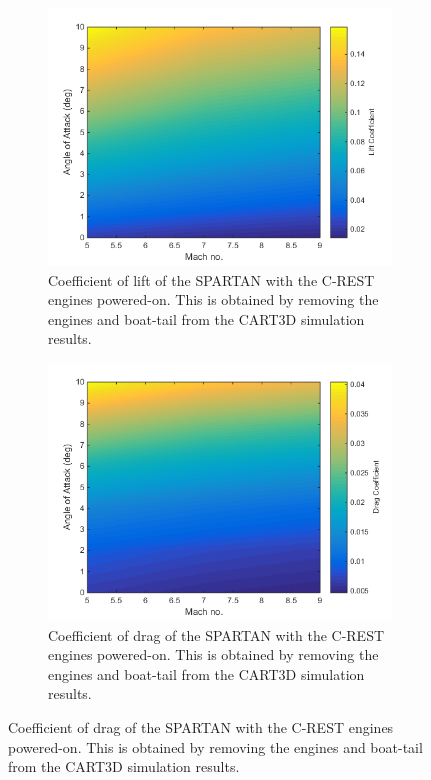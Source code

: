 \begin{figure}
	\begin{subfigure}{.5\textwidth}
	\centering
	\includegraphics[width=0.99\linewidth]{figures/3_vehicle_design/Cl-EngineOn}
	\caption{Coefficient of lift of the SPARTAN with the C-REST engines powered-on. This is obtained by removing the engines and boat-tail from the CART3D simulation results.}
	\label{fig:Cl-EngineOn}
\end{subfigure}
\begin{subfigure}{.5\textwidth}
	\centering
	\includegraphics[width=0.99\linewidth]{figures/3_vehicle_design/Cd-EngineOn}
	\caption{Coefficient of drag of the SPARTAN with the C-REST engines powered-on. This is obtained by removing the engines and boat-tail from the CART3D simulation results.}

\end{subfigure}
\end{figure}
